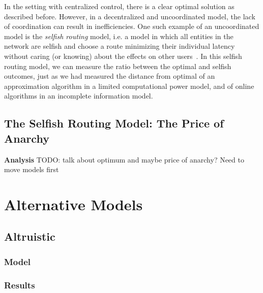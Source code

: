 \documentclass[acmlarge]{acmart}
\begin{document}
In the setting with centralized control, there is a clear optimal solution as described before.
However, in a decentralized and uncoordinated model, the lack of coordination can result in
inefficiencies. One such example of an uncoordinated model is the \emph{selfish routing} model, i.e. 
a model in which all entities in the network are selfish and choose a route minimizing their individual latency without caring (or knowing) about the effects on other users~\cite{tardos}.
In this selfish routing model, we can measure the ratio between the optimal and selfish outcomes, just as we had measured the distance from optimal of an approximation algorithm in a limited computational power model, and of online algorithms in an incomplete information model. 

\subsection{The Selfish Routing Model: The Price of Anarchy}

\textbf{Analysis} 
TODO: talk about optimum and maybe price of anarchy? Need to move models first

\section{Alternative Models}

\subsection{Altruistic}
\subsubsection{Model}
\subsubsection{Results}

\end{document}
